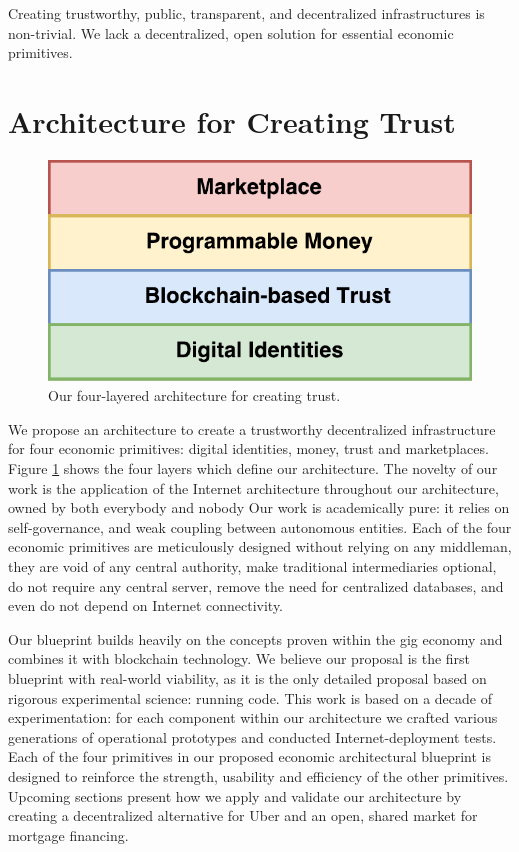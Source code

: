 \documentclass[USenglish]{article}
\begin{document}
Creating trustworthy, public, transparent, and decentralized infrastructures is non-trivial.
We lack a decentralized, open solution for essential economic primitives. 

\section{Architecture for Creating Trust}

\begin{figure}[t]
	\centering
	\includegraphics[width=1\columnwidth]{assets/tech_stack_simple}
	\caption{Our four-layered architecture for creating trust.}
	\label{fig:tech_stack_simple}
\end{figure}

We propose an architecture to create a trustworthy decentralized infrastructure for four economic primitives: digital identities, money, trust and marketplaces.
Figure \ref{fig:tech_stack_simple} shows the four layers which define our architecture.
The novelty of our work is the application of the Internet architecture throughout our architecture, owned by both everybody and nobody
Our work is academically pure: it relies on self-governance, and weak coupling between autonomous entities. 
Each of the four economic primitives are meticulously designed without relying on any middleman, they are void of any central authority, make traditional intermediaries optional, do not require any central server, remove the need for centralized databases, and even do not depend on Internet connectivity.

Our blueprint builds heavily on the concepts proven within the gig economy and combines it with blockchain technology.
We believe our proposal is the first blueprint with real-world viability, as it is the only detailed proposal based on rigorous experimental science: running code.
This work is based on a decade of experimentation: for each component within our architecture we crafted various generations of operational prototypes and conducted Internet-deployment tests.
Each of the four primitives in our proposed economic architectural blueprint is designed to reinforce the strength, usability and efficiency of the other primitives. 
Upcoming sections present how we apply and validate our architecture by creating a decentralized alternative for Uber and an open, shared market for mortgage financing.
\end{document}
